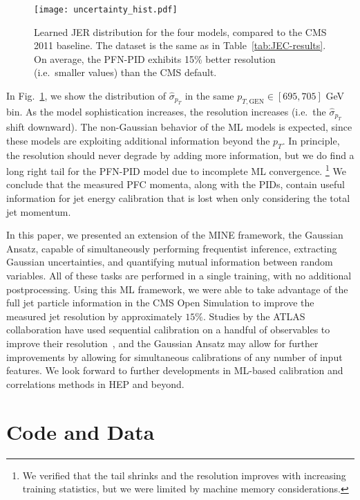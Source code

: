 \documentclass[prl,twocolumn,superscriptaddress,longbibliography,preprintnumbers,floatfix,nofootinbib]{revtex4-1}
\DeclareRobustCommand{\Tab}[1]{Table~\ref{tab:#1}}
\DeclareRobustCommand{\Fig}[1]{Fig.~\ref{fig:#1}}
\newcommand{\GaussianAnsatz}{{Gaussian Ansatz}\xspace}
\begin{document}
\begin{figure}[t]
    \centering
    \texttt{[image: uncertainty\_hist.pdf]}
    \caption{
    Learned JER distribution for the four models, compared to the CMS 2011 baseline.
    The dataset is the same as in \Tab{JEC-results}.
    On average, the PFN-PID exhibits 15\% better resolution (i.e.~smaller values) than the CMS default.}
    \label{fig:JEC-sigma}
\end{figure}


In \Fig{JEC-sigma}, we show the distribution of $\hat{\sigma}_{p_T}$ in the same $p_{T, \text{GEN}} \in [695,705]$ GeV bin.
%
As the model sophistication increases, the resolution increases (i.e.~the $\hat{\sigma}_{p_T}$ shift downward).
%
The non-Gaussian behavior of the ML models is expected, since these models are exploiting additional information beyond the $p_T$.
%
In principle, the resolution should never degrade by adding more information, but we do find a long right tail for the PFN-PID model due to incomplete ML convergence.%
%
\footnote{We verified that the tail shrinks and the resolution improves with increasing training statistics, but we were limited by machine memory considerations.}
%
We conclude that the measured PFC momenta, along with the PIDs, contain useful information for jet energy calibration that is lost when only considering the total jet momentum.


In this paper, we presented an extension of the MINE framework, the \GaussianAnsatz, capable of simultaneously
%
performing frequentist inference,
extracting Gaussian uncertainties,
and quantifying mutual information between random variables.
%
All of these tasks are performed in a single training, with no additional postprocessing.
%
Using this ML framework, we were able to take advantage of the full jet particle information in the CMS Open Simulation to improve the measured jet resolution by approximately $15\%$.
%
Studies by the ATLAS collaboration have used sequential calibration on a handful of observables to improve their resolution~\cite{ATLAS:2017bje,ATLAS:2014hvo,ATLAS:2019oxp}, and the Gaussian Ansatz may allow for further improvements by allowing for simultaneous calibrations of any number of input features.
%
We look forward to further developments in ML-based calibration and correlations methods in HEP and beyond.


\section*{Code and Data}
\end{document}
